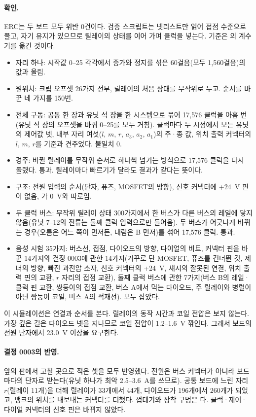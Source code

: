\paragraph{확인.} ERC는 두 보드 모두 위반 0건이다. 검증 스크립트는 넷리스트만 읽어 접점 수준으로 풀고, 자기
유지가 있으므로 릴레이의 상태를 이어 가며 클럭을 넣는다. 기준은 의 계수기를 옮긴 것이다.

\begin{itemize}
\item 자리 하나: 시작값 0--25 각각에서 증가와 정지를 섞은 60걸음(모두 1,560걸음)의 값과 올림.
\item 원위치: 크립 오프셋 26가지 전부, 릴레이의 처음 상태를 무작위로 두고. 순서를 바꾼 네 가지를 150번.
\item 전체 구동: 공통 한 장과 유닛 석 장을 한 시스템으로 묶어 17,576 클럭을 아홉 번(유닛 석 장의 오프셋을 바꿔
0--25를 모두 거침). 클럭마다 두 시점에서 모든 유닛의 제어값 넷, 내부 자리 여섯($l$, $m$, $r$, $a_3$, $a_2$,
$a_1$)의 주·종 값, 위치 출력 커넥터의 $l$, $m$, $r$를 기준과 견주었다. 불일치 0.
\item 경주: 바뀔 릴레이를 무작위 순서로 하나씩 넘기는 방식으로 17,576 클럭을 다시 돌렸다. 통과. 릴레이마다
빠르기가 달라도 결과가 같다는 뜻이다.
\item 구조: 전원 입력의 순서(단자, 퓨즈, MOSFET의 방향), 신호 커넥터에 +24~V 핀이 없음, 가 0~V와
따로임.
\item 두 클럭 버스: 무작위 릴레이 상태 300가지에서 한 버스가 다른 버스의 레일에 닿지 않음(유닛 7--12의 전류는
둘째 클럭 입력으로만 들어옴). 두 버스가 어긋나게 바뀌는 경우(오름은 어느 쪽이 먼저든, 내림은 B 먼저)를 섞어
17,576 클럭. 통과.
\item 음성 시험 35가지: 버스선, 접점, 다이오드의 방향, 다이얼의 비트, 커넥터 핀을 바꾼 14가지와 결정 0003에 관한
14가지(거꾸로 단 MOSFET, 퓨즈를 건너뛴 것, 제너의 방향, 빠진 과전압 소자, 신호 커넥터의 +24~V, 섀시의 잘못된
연결, 위치 출력 핀의 교환, $r$ 자리의 접점 교환), 둘째 클럭 버스에 관한 7가지(버스 B의 레일·클럭 핀 교환, 쌍둥이의
접점 교환, 버스 A에서 먹는 다이오드, 주 릴레이와 병렬이 아닌 쌍둥이 코일, 버스 A의 적재선). 모두 잡았다.
\end{itemize}

이 시뮬레이션은 연결과 순서를 본다. 릴레이의 동작 시간과 코일 전압은 보지 않는다. 가장 깊은 길은 다이오드
넷을 지나므로 코일 전압이 1.2--1.6~V 깎인다. 그래서 보드의 전원 단자에서 23.0~V 이상을 요구한다.

\paragraph{결정 0003의 반영.} 앞의 판에서 고칠 곳으로 적은 셋을 모두 반영했다. 전원은 버스 커넥터가 아니라 보드마다의
단자로 받는다(유닛 하나가 최악 2.5--3.6~A를 쓰므로). 공통 보드에 느린 자리 $r$(릴레이 11개)을 더해 릴레이가 33개에서
44개, 다이오드가 196개에서 260개가 되었고, 뱅크의 위치를 내보내는 커넥터를 더했다. 껍데기와 장착 구멍은
다. 클럭·제어·다이얼 커넥터의 신호 핀은 바뀌지 않았다.

